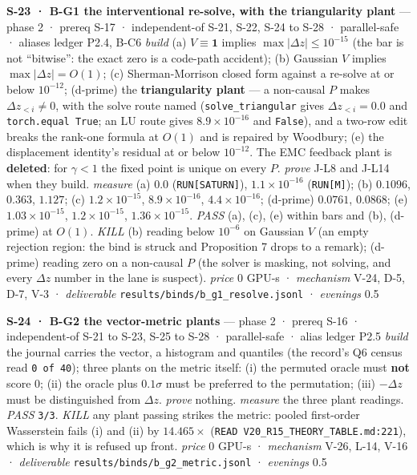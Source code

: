 \documentclass[11pt,a4paper]{article}
\theoremstyle{plain}
\theoremstyle{definition}
\theoremstyle{remark}
\begin{document}
\textbf{S-23 · B-G1 the interventional re-solve, with the triangularity
plant} --- phase 2 · prereq S-17 · independent-of S-21, S-22, S-24 to
S-28 · parallel-safe · aliases ledger P2.4, B-C6 \emph{build} (a)
\(V\equiv\mathbf 1\) implies \(\max|\Delta z|\le10^{-15}\) (the bar is
not ``bitwise'': the exact zero is a code-path accident); (b) Gaussian
\(V\) implies \(\max|\Delta z|=O(1)\); (c) Sherman-Morrison closed form
against a re-solve at or below \(10^{-12}\); (d-prime) the
\textbf{triangularity plant} --- a non-causal \(P\) makes
\(\Delta z_{<i}\ne0\), with the solve route named
(\texttt{solve\_triangular} gives \(\Delta z_{<i}=0.0\) and
\texttt{torch.equal\ True}; an LU route gives \(8.9\times10^{-16}\) and
\texttt{False}), and a two-row edit breaks the rank-one formula at
\(O(1)\) and is repaired by Woodbury; (e) the displacement identity's
residual at or below \(10^{-12}\). The EMC feedback plant is
\textbf{deleted}: for \(\gamma<1\) the fixed point is unique on every
\(P\). \emph{prove} J-L8 and J-L14 when they build. \emph{measure} (a)
\(0.0\) (\texttt{RUN{[}SATURN{]}}), \(1.1\times10^{-16}\)
(\texttt{RUN{[}M{]}}); (b) \(0.1096\), \(0.363\), \(1.127\); (c)
\(1.2\times10^{-15}\), \(8.9\times10^{-16}\), \(4.4\times10^{-16}\);
(d-prime) \(0.0761\), \(0.0868\); (e) \(1.03\times10^{-15}\),
\(1.2\times10^{-15}\), \(1.36\times10^{-15}\). \emph{PASS} (a), (c), (e)
within bars and (b), (d-prime) at \(O(1)\). \emph{KILL} (b) reading
below \(10^{-6}\) on Gaussian \(V\) (an empty rejection region: the bind
is struck and Proposition 7 drops to a remark); (d-prime) reading zero
on a non-causal \(P\) (the solver is masking, not solving, and every
\(\Delta z\) number in the lane is suspect). \emph{price} \(0\) GPU-s ·
\emph{mechanism} V-24, D-5, D-7, V-3 · \emph{deliverable}
\texttt{results/binds/b\_g1\_resolve.jsonl} · \emph{evenings} 0.5

\textbf{S-24 · B-G2 the vector-metric plants} --- phase 2 · prereq S-16
· independent-of S-21 to S-23, S-25 to S-28 · parallel-safe · alias
ledger P2.5 \emph{build} the journal carries the vector, a histogram and
quantiles (the record's Q6 census read \texttt{0\ of\ 40}); three plants
on the metric itself: (i) the permuted oracle must \textbf{not} score
\(0\); (ii) the oracle plus \(0.1\sigma\) must be preferred to the
permutation; (iii) \(-\Delta z\) must be distinguished from
\(\Delta z\). \emph{prove} nothing. \emph{measure} the three plant
readings. \emph{PASS} \texttt{3/3}. \emph{KILL} any plant passing
strikes the metric: pooled first-order Wasserstein fails (i) and (ii) by
\(14.465\times\) (\texttt{READ\ V20\_R15\_THEORY\_TABLE.md:221}), which
is why it is refused up front. \emph{price} \(0\) GPU-s ·
\emph{mechanism} V-26, L-14, V-16 · \emph{deliverable}
\texttt{results/binds/b\_g2\_metric.jsonl} · \emph{evenings} 0.5
\end{document}
